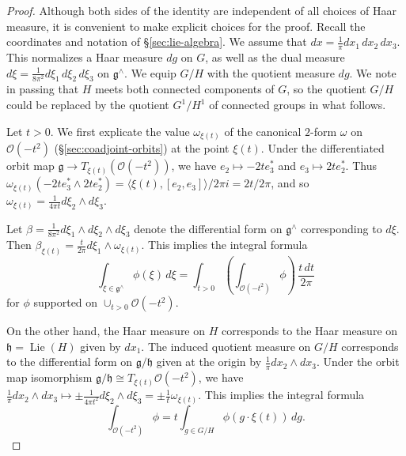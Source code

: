 \documentclass[reqno,10pt]{amsart}
\theoremstyle{plain} %
\theoremstyle{definition}
\theoremstyle{plain} %
\theoremstyle{remark}
\theoremstyle{itplain} %
\theoremstyle{remark} %
\numberwithin{equation}{section}
\DeclareMathOperator{\Lie}{Lie}
\begin{document}
\begin{proof}
  Although both sides of the identity are independent of all choices of Haar measure, it is convenient to make explicit choices for the proof.  Recall the coordinates and notation of \S\ref{sec:lie-algebra}.  We assume that $d x = \frac{1}{ \pi } d x_1 \, d x_2 \, d x_3$.  This normalizes a Haar measure $d g$ on $G$, as well as the dual measure $d \xi = \frac{1}{8 \pi^2} d \xi_1 \, d \xi_2 \, d \xi_3$ on $\mathfrak{g}^\wedge$.  We equip $G/H$ with the quotient measure $d g$.  We note in passing that $H$ meets both connected components of $G$, so the quotient $G/H$ could be replaced by the quotient $G^1/H^1$ of connected groups in what follows.

  Let $t > 0$.  We first explicate the value $\omega_{\xi(t)}$ of the canonical $2$-form $\omega$ on $\mathcal{O}(-t^2)$ (\S\ref{sec:coadjoint-orbits}) at the point $\xi(t)$.  Under the differentiated orbit map $\mathfrak{g} \rightarrow T_{\xi(t)}(\mathcal{O}(-t^2))$, we have $e_2 \mapsto - 2 t e_3^*$ and $e_3 \mapsto 2 t e_2^*$.  Thus $\omega_{\xi(t)}(- 2 t e_3^* \wedge 2 t e_2^*) = \langle \xi(t), [e_2, e_3] \rangle/2 \pi i = 2 t / 2 \pi$, and so $\omega_{\xi(t)} = \frac{1}{4 \pi t } d \xi_2 \wedge d \xi_3$.

  Let $\beta = \frac{1}{8 \pi^2} d \xi_1 \wedge d \xi_2 \wedge d \xi_3$ denote the differential form on $\mathfrak{g}^\wedge$ corresponding to $d \xi$.  Then $\beta_{\xi(t)} = \frac{t}{2 \pi } d \xi_1 \wedge \omega_{\xi(t)}$.  This implies the integral formula
  \begin{equation*}
    \int_{\xi \in \mathfrak{g}^\wedge} \phi(\xi) \, d \xi
    = \int_{t > 0}
    \left(\int_{\mathcal{O}(-t^2)} \phi \right)
    \, \frac{t \, d t}{ 2 \pi }
  \end{equation*}
  for $\phi$ supported on $\cup_{t>0} \mathcal{O}(-t^2)$.

  On the other hand, the Haar measure on $H$ corresponds to the Haar measure on $\mathfrak{h} = \Lie(H)$ given by $d x_1$.  The induced quotient measure on $G/H$ corresponds to the differential form on $\mathfrak{g}/\mathfrak{h}$ given at the origin by $\frac{1}{\pi } d x_2 \wedge d x_3$.  Under the orbit map isomorphism $\mathfrak{g}/\mathfrak{h} \cong T_{\xi(t)} \mathcal{O}(-t^2)$, we have $\frac{1}{ \pi } d x_2 \wedge d x_3 \mapsto \pm \frac{1}{4 \pi t^2} d \xi_2 \wedge d \xi_3 = \pm \frac{1}{t} \omega_{\xi(t)}$.  This implies the integral formula
  \begin{equation*}
    \int_{\mathcal{O}(-t^2)} \phi 
    = t
    \int_{g \in G/H} \phi(g \cdot \xi(t)) \, d g.
  \end{equation*}


\end{proof}
\end{document}
